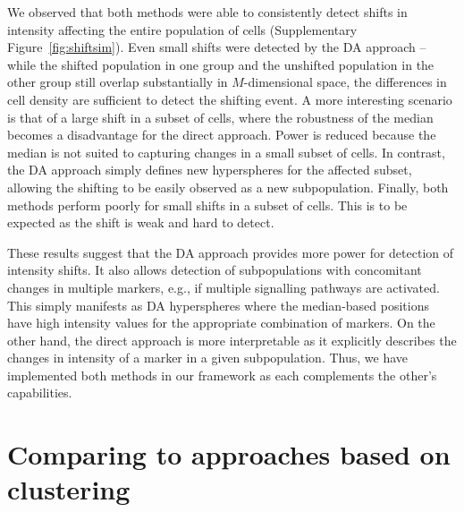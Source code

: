 \documentclass{article}
\begin{document}

We observed that both methods were able to consistently detect shifts in intensity affecting the entire population of cells (Supplementary Figure~\ref{fig:shiftsim}).
Even small shifts were detected by the DA approach -- while the shifted population in one group and the unshifted population in the other group still overlap substantially in $M$-dimensional space, the differences in cell density are sufficient to detect the shifting event.
A more interesting scenario is that of a large shift in a subset of cells, where the robustness of the median becomes a disadvantage for the direct approach.
Power is reduced because the median is not suited to capturing changes in a small subset of cells.
In contrast, the DA approach simply defines new hyperspheres for the affected subset, allowing the shifting to be easily observed as a new subpopulation.
Finally, both methods perform poorly for small shifts in a subset of cells.
This is to be expected as the shift is weak and hard to detect.

These results suggest that the DA approach provides more power for detection of intensity shifts.
It also allows detection of subpopulations with concomitant changes in multiple markers, e.g., if multiple signalling pathways are activated.
This simply manifests as DA hyperspheres where the median-based positions have high intensity values for the appropriate combination of markers.
On the other hand, the direct approach is more interpretable as it explicitly describes the changes in intensity of a marker in a given subpopulation.
Thus, we have implemented both methods in our framework as each complements the other's capabilities.

\section{Comparing to approaches based on clustering}
\end{document}
